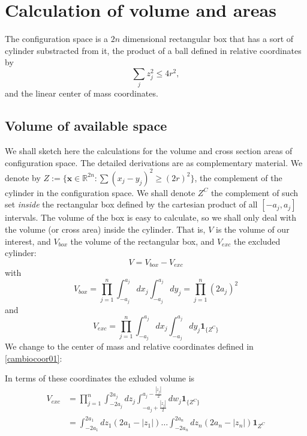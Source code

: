 \documentclass[superscriptaddress,pre,reprint,showpacs,twocolumn]{revtex4-1}
\newcommand{\indicatorsymbol}{\mathbf{1}}
\newcommand{\indicator}[1]{\indicatorsymbol_{ \{   #1 \} } }
\begin{document}

\section{Calculation of volume and areas}

The configuration space is a $2n$ dimensional rectangular box
that has a sort of cylinder substracted from it, the
product of a ball defined in relative coordinates by
\begin{equation}
  \sum_j z_j^2 \leq 4 r^2,
\end{equation}
and the linear center of mass coordinates.



\subsection{Volume of available space}

We shall sketch here the calculations for the volume and cross section areas
of configuration space. The detailed derivations are as complementary material.
We denote by $Z := \{ \mathbf{x} \in \mathbb{R}^{2n}: \sum (x_j-y_j)^2 \ge (2r)^2 \}$,
the complement of the cylinder in the configuration space.
We shall denote $Z^C$ the complement of such set \emph{inside} the rectangular
box defined by the cartesian product of all $[-a_j, a_j ]$ intervals.
The volume of the box is easy to calculate, so we shall only deal with
the volume (or cross area) inside the cylinder. That is, $V$ is the volume of
our interest, and $V_{box}$ the volume of the rectangular box, and $V_{exc}$ the
excluded cylinder:
\begin{equation}
V = V_{box} - V_{exc}
\end{equation}
with
\begin{equation}
V_{box} =  \prod_{j=1}^n \int_{-a_j}^{a_j} dx_j \int_{-a_j}^{a_j}  dy_j = \prod_{j=1}^n (2 a_j)^2 
\end{equation}
and
\begin{equation}
V_{exc} =  \prod_{j=1}^n \int_{-a_j}^{a_j} dx_j \int_{-a_j}^{a_j}  dy_j  \indicator{Z^C}
\end{equation}
We change to
the center of mass and relative coordinates defined in \eqref{cambiocoor01}:

In terms of these coordinates the exluded volume is 
\begin{align}
V_{exc} & =  \prod_{j=1}^n \int_{-2a_j}^{2a_j} dz_j \int_{-a_j + \frac{|z_j|}{2}}^{a_j - \frac{|z_j|}{2}}  dw_j  \indicator{Z^C} \\
& = \int_{-2a_1}^{2a_1} dz_1 (2a_1 -|z_1|)  \ldots \int_{-2a_n}^{2a_n} dz_n (2a_n - |z_n|)  \mathbf{1}_{Z^C} 
\end{align}
\end{document}
